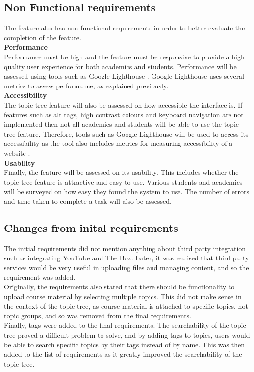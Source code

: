 \subsection{Non Functional requirements}
The feature also has non functional requirements in order to better evaluate the completion of the feature. \\

\textbf{Performance} \\
Performance must be high and the feature must be responsive to provide a high quality user experience for both academics and students. Performance will be assessed using tools such as Google Lighthouse \cite{googleLighthouse}. Google Lighthouse uses several metrics to assess performance, as explained previously. \\

\textbf{Accessibility} \\
The topic tree feature will also be assessed on how accessible the interface is. If features such as alt tags, high contrast colours and keyboard navigation are not implemented then not all academics and students will be able to use the topic tree feature. Therefore, tools such as Google Lighthouse will be used to access its accessibility as the tool also includes metrics for measuring accessibility of a website \cite{googleLighthouseAccessibility}. \\

\textbf{Usability} \\
Finally, the feature will be assessed on its usability. This includes whether the topic tree feature is attractive and easy to use. Various students and academics will be surveyed on how easy they found the system to use. The number of errors and time taken to complete a task will also be assessed.\\

\subsection {Changes from inital requirements}

The initial requirements did not mention anything about third party integration such as integrating YouTube and The Box. Later, it was realised that third party services would be very useful in uploading files and managing content, and so the requirement was added.\\

Originally, the requirements also stated that there should be functionality to upload course material by selecting multiple topics. This did not make sense in the context of the topic tree, as course material is attached to specific topics, not topic groups, and so was removed from the final requirements.\\

Finally, tags were added to the final requirements. The searchability of the topic tree proved a difficult problem to solve, and by adding tags to topics, users would be able to search specific topics by their tags instead of by name. This was then added to the list of requirements as it greatly improved the searchability of the topic tree.\\